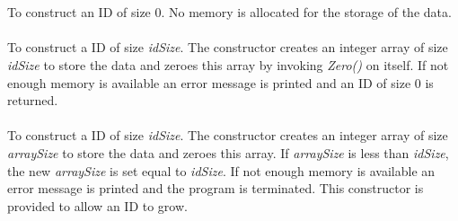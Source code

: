  \\
  \\ 
  \\
  \\
  \\
  \\ \\
 \\
\\  \\
  \\
 \\
 \\
 \\
 \\ \\
  \\
 \\
 \\
\\
 \\  
 \\ 



  \\
  \\
To construct an ID of size $0$. No memory is allocated for the storage
of the data. \\

  \\
To construct a ID of size {\em idSize}. The constructor creates an
integer array of size {\em idSize} to store the data and zeroes this
array by invoking {\em Zero()} on itself. If not enough memory is
available an error message is printed and an ID of size $0$ is
returned. \\  

  \\
To construct a ID of size {\em idSize}. The constructor creates an
integer array of size {\em arraySize} to store the data and zeroes
this array. If {\em arraySize} is less than {\em idSize}, the new {\em
arraySize} is set equal to {\em idSize}. If not enough memory is
available an error message is printed and the program is
terminated. This constructor is provided to allow an ID to grow. \\  

